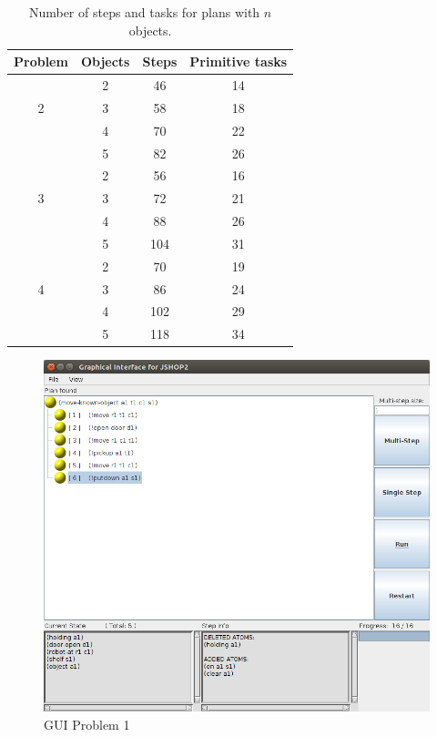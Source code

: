 \documentclass[paper=a4, fontsize=11pt]{scrartcl}
\begin{document}
	\begin{table}[h!]

		\centering

		\begin{tabular}{cccc}
			\toprule

			Problem & Objects & Steps  & Primitive tasks\\
			\midrule

			\multirow{3}{*}[-3pt]{2} & {2} & {46} & {14} \\

			{} & {3} & {58} & {18} \\

			{} & {4} & {70} & {22} \\

			{} & {5} & {82} & {26} \\

			\midrule

			\multirow{3}{*}[-3pt]{3} & {2} & {56} & {16} \\

			{} & {3} & {72} & {21} \\

			{} & {4} & {88} & {26} \\

			{} & {5} & {104} & {31} \\

			\midrule

			\multirow{3}{*}[-3pt]{4} & {2} & {70} & {19} \\

			{} & {3} & {86} & {24} \\

			{} & {4} & {102} & {29} \\

			{} & {5} & {118} & {34} \\

			\bottomrule
		\end{tabular}
		\caption{Number of steps and tasks for plans with $n$ objects.}
		\label{table:n-objects}
	\end{table}


	\begin{figure}[h!]
		\centering
		\includegraphics[width=0.65\linewidth]{images/problem1_gui}
		\caption{GUI Problem 1 }
		\label{fig:probem1_gui}
	\end{figure}
\end{document}
